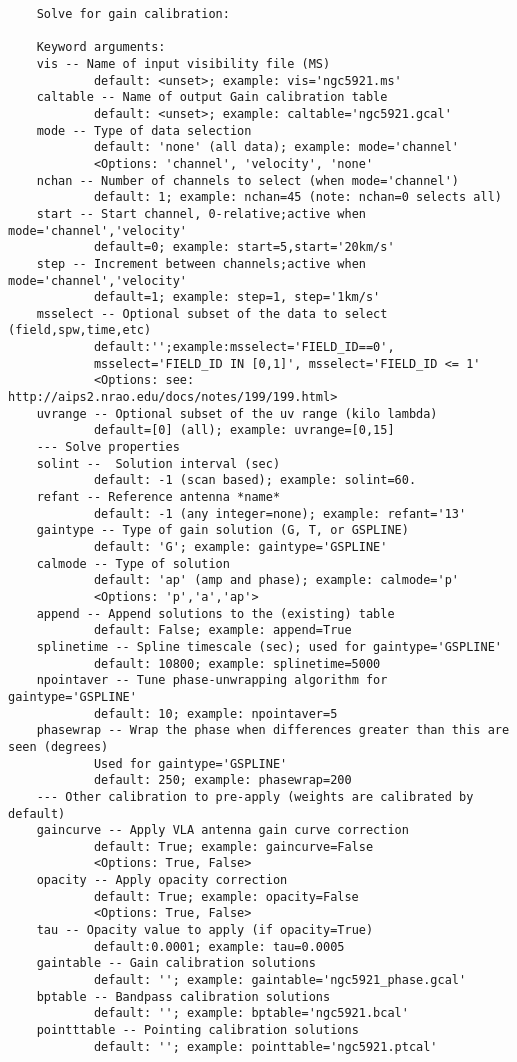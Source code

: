 \small
\begin{verbatim}
    Solve for gain calibration:
    
    Keyword arguments:
    vis -- Name of input visibility file (MS)
            default: <unset>; example: vis='ngc5921.ms'
    caltable -- Name of output Gain calibration table
            default: <unset>; example: caltable='ngc5921.gcal'
    mode -- Type of data selection
            default: 'none' (all data); example: mode='channel'
            <Options: 'channel', 'velocity', 'none'
    nchan -- Number of channels to select (when mode='channel')
            default: 1; example: nchan=45 (note: nchan=0 selects all)
    start -- Start channel, 0-relative;active when mode='channel','velocity'
            default=0; example: start=5,start='20km/s'
    step -- Increment between channels;active when mode='channel','velocity'
            default=1; example: step=1, step='1km/s'
    msselect -- Optional subset of the data to select (field,spw,time,etc)
            default:'';example:msselect='FIELD_ID==0', 
            msselect='FIELD_ID IN [0,1]', msselect='FIELD_ID <= 1'
            <Options: see: http://aips2.nrao.edu/docs/notes/199/199.html>
    uvrange -- Optional subset of the uv range (kilo lambda)
            default=[0] (all); example: uvrange=[0,15]
    --- Solve properties
    solint --  Solution interval (sec)
            default: -1 (scan based); example: solint=60.
    refant -- Reference antenna *name*
            default: -1 (any integer=none); example: refant='13'
    gaintype -- Type of gain solution (G, T, or GSPLINE)
            default: 'G'; example: gaintype='GSPLINE'
    calmode -- Type of solution
            default: 'ap' (amp and phase); example: calmode='p'
            <Options: 'p','a','ap'>
    append -- Append solutions to the (existing) table
            default: False; example: append=True
    splinetime -- Spline timescale (sec); used for gaintype='GSPLINE'
            default: 10800; example: splinetime=5000
    npointaver -- Tune phase-unwrapping algorithm for gaintype='GSPLINE'
            default: 10; example: npointaver=5
    phasewrap -- Wrap the phase when differences greater than this are seen (degrees)
            Used for gaintype='GSPLINE'
            default: 250; example: phasewrap=200
    --- Other calibration to pre-apply (weights are calibrated by default)
    gaincurve -- Apply VLA antenna gain curve correction
            default: True; example: gaincurve=False
            <Options: True, False>
    opacity -- Apply opacity correction
            default: True; example: opacity=False
            <Options: True, False>
    tau -- Opacity value to apply (if opacity=True)
            default:0.0001; example: tau=0.0005
    gaintable -- Gain calibration solutions
            default: ''; example: gaintable='ngc5921_phase.gcal'
    bptable -- Bandpass calibration solutions
            default: ''; example: bptable='ngc5921.bcal'
    pointttable -- Pointing calibration solutions
            default: ''; example: pointtable='ngc5921.ptcal'
\end{verbatim}
\normalsize


